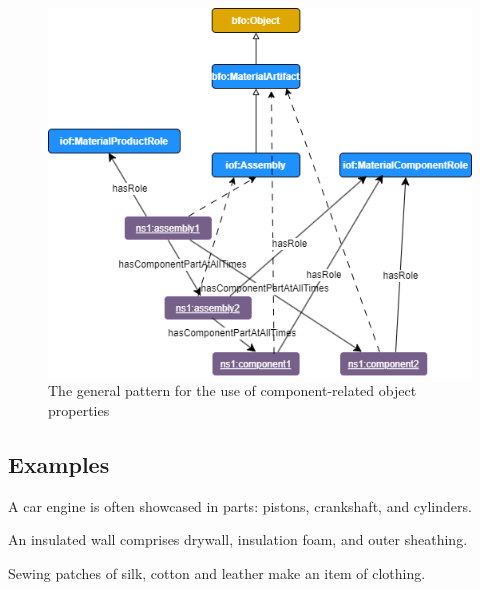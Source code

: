 \begin{figure}
\includegraphics[scale=0.5]{scenarios/assemblies-components/images/assembly-components-generic.png}
\caption{The general pattern for the use of component-related object properties} 
\label{gen-pttn-components}
\end{figure}


\subsection*{Examples}

A car engine is often showcased in parts: pistons, crankshaft, and cylinders.

An insulated wall comprises drywall, insulation foam, and outer sheathing.

Sewing patches of silk, cotton and leather make an item of clothing.
